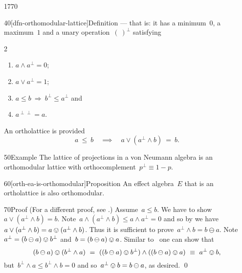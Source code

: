 \begin{parsec}{1770}
\begin{point}{40}[dfn-orthomodular-lattice]{Definition}
    --- that is: it has a minimum~$0$,
    a maximum~$1$
    and a unary operation~$(\ )^\perp$
    satisfying
\begin{multicols}{2}
\begin{enumerate}
\item $a \wedge a^\perp = 0$;
\item $a \vee a^\perp = 1$;
\item $a \leq b  \ \Rightarrow\ b^\perp \leq a^\perp$ and
\item $a^{\perp\perp} = a$.
\end{enumerate}    
\end{multicols}
    An ortholattice is 
 provided
\begin{equation*}
    a \ \leq \ b \quad \implies \quad a \vee (a^\perp \wedge b) \ =\  b.
\end{equation*}
\end{point}
\begin{point}{50}{Example}%
The lattice of projections in a von Neumann algebra
    is an orthomodular lattice with
    orthocomplement~$p^\perp \equiv 1 - p$.
\end{point}
\begin{point}{60}[orth-ea-is-orthomodular]{Proposition}%
An effect algebra~$E$
    that is an ortholattice
    is also orthomodular.
\begin{point}{70}{Proof}%
(For a different proof, see \cite[Prop.~1.5.8]{dvurecenskij2013new}.)
Assume~$a \leq b$.
We have to show~$a \vee (a^\perp \wedge b) = b$.
Note~$a \wedge (a^\perp \wedge b) \leq a \wedge a^\perp = 0$
and so by 
we have~$a \vee (a^\perp \wedge b) = a \ovee (a^\perp \wedge b)$.
Thus it is sufficient to prove~$a^\perp \wedge b = b \ominus a$.
Note~$a^\perp = (b \ominus a) \ovee b^\perp$
    and~$b = (b \ominus a) \ovee a$.
Similar to~
    one can show that
\begin{equation*}
    (b \ominus a) \ovee (b^\perp \wedge a)
    \ = \
        ((b \ominus a) \ovee b^\perp) \wedge 
        ((b \ominus a) \ovee a) \ \equiv \ a^\perp \ovee b,
\end{equation*}
but~$b^\perp \wedge a \leq b^\perp \wedge b = 0$
    and so~$a^\perp \ovee b = b\ominus a$, as desired.
\qed
\end{point}
\end{point}
\end{parsec}

